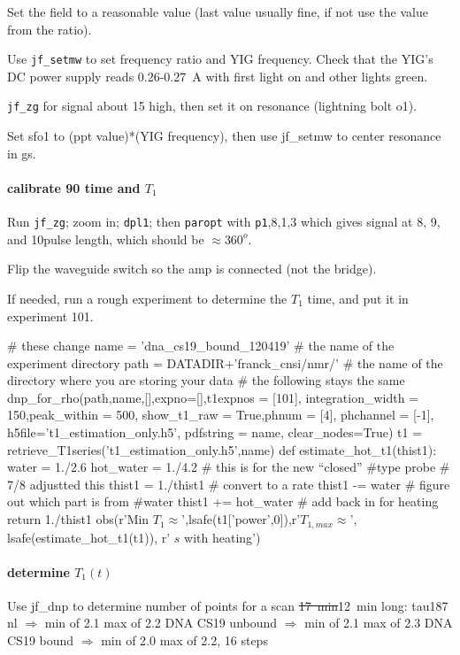 Set the field to a reasonable value (last value usually fine, if not use the value from the ratio).

Use \texttt{jf\_setmw} to set frequency ratio and YIG frequency.
Check that the YIG's DC power supply reads 0.26-0.27~A with first light on and other lights green.

\texttt{jf\_zg} for signal about 15 high, then set it on resonance (lightning bolt o1).

Set sfo1 to (ppt value)*(YIG frequency), then use jf\_setmw to center resonance in gs.

\paragraph{calibrate 90 time and $T_1$}

Run \texttt{jf_zg}; zoom in; \texttt{dpl1}; then \texttt{paropt} with \texttt{p1},8,1,3 which gives signal at 8\us, 9\us, and 10\us pulse length, which should be $\approx 360^o$.

Flip the waveguide switch so the amp is connected (not the bridge).

If needed, run a rough experiment to determine the $T_1$ time, and put it in experiment 101.

\begin{scriptsize}
\begin{python}[off]
# these change
name = 'dna_cs19_bound_120419' # the name of the experiment directory
path = DATADIR+'franck_cnsi/nmr/' # the name of the directory where you are storing your data
# the following stays the same
dnp_for_rho(path,name,[],expno=[],t1expnos = [101],
        integration_width = 150,peak_within = 500,
        show_t1_raw = True,phnum = [4],
        phchannel = [-1],
        h5file='t1_estimation_only.h5',
        pdfstring = name,
        clear_nodes=True)
t1 = retrieve_T1series('t1_estimation_only.h5',name)
def estimate_hot_t1(thist1):
    water = 1./2.6
    hot_water = 1./4.2 # this is for the new ``closed''
    #type probe # 7/8 adjustted this
    thist1 = 1./thist1 # convert to a rate
    thist1 -= water # figure out which part is from
    #water
    thist1 += hot_water # add back in for heating
    return 1./thist1
obs(r'Min $T_1\approx$',lsafe(t1['power',0]),r'\quad $T_{1,max}\approx$',
        lsafe(estimate_hot_t1(t1)),
        r' $s$ with heating')
\end{python}
\end{scriptsize}
\paragraph{determine $T_1(t)$}
Use jf\_dnp to determine number of points for a scan \sout{17~min}12~min long:
tau187 nl $\Rightarrow$ min of 2.1 max of 2.2
DNA CS19 unbound $\Rightarrow$ min of 2.1 max of 2.3
DNA CS19 bound $\Rightarrow$ min of 2.0 max of 2.2, 16 steps

